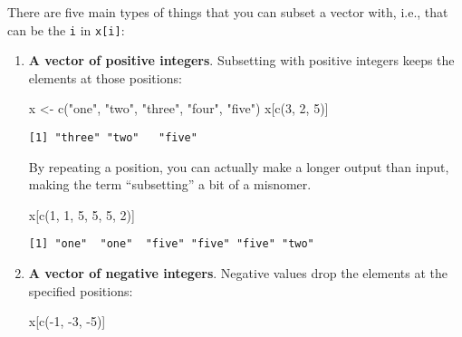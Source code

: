 \documentclass[
  letterpaper,
  DIV=11,
  numbers=noendperiod]{scrreprt}
\newenvironment{Shaded}{\begin{snugshade}}{\end{snugshade}}
\newcommand{\DecValTok}[1]{\textcolor[rgb]{0.68,0.00,0.00}{#1}}
\newcommand{\FunctionTok}[1]{\textcolor[rgb]{0.28,0.35,0.67}{#1}}
\newcommand{\NormalTok}[1]{\textcolor[rgb]{0.00,0.23,0.31}{#1}}
\newcommand{\OtherTok}[1]{\textcolor[rgb]{0.00,0.23,0.31}{#1}}
\newcommand{\SpecialCharTok}[1]{\textcolor[rgb]{0.37,0.37,0.37}{#1}}
\newcommand{\StringTok}[1]{\textcolor[rgb]{0.13,0.47,0.30}{#1}}
\begin{document}
There are five main types of things that you can subset a vector with,
i.e., that can be the \texttt{i} in \texttt{x{[}i{]}}:

\begin{enumerate}
\def\labelenumi{\arabic{enumi}.}
\item
  \textbf{A vector of positive integers}. Subsetting with positive
  integers keeps the elements at those positions:

\begin{Shaded}
\begin{Highlighting}[]
\NormalTok{x }\OtherTok{\textless{}{-}} \FunctionTok{c}\NormalTok{(}\StringTok{"one"}\NormalTok{, }\StringTok{"two"}\NormalTok{, }\StringTok{"three"}\NormalTok{, }\StringTok{"four"}\NormalTok{, }\StringTok{"five"}\NormalTok{)}
\NormalTok{x[}\FunctionTok{c}\NormalTok{(}\DecValTok{3}\NormalTok{, }\DecValTok{2}\NormalTok{, }\DecValTok{5}\NormalTok{)]}
\end{Highlighting}
\end{Shaded}

\begin{verbatim}
[1] "three" "two"   "five" 
\end{verbatim}

  By repeating a position, you can actually make a longer output than
  input, making the term ``subsetting'' a bit of a misnomer.

\begin{Shaded}
\begin{Highlighting}[]
\NormalTok{x[}\FunctionTok{c}\NormalTok{(}\DecValTok{1}\NormalTok{, }\DecValTok{1}\NormalTok{, }\DecValTok{5}\NormalTok{, }\DecValTok{5}\NormalTok{, }\DecValTok{5}\NormalTok{, }\DecValTok{2}\NormalTok{)]}
\end{Highlighting}
\end{Shaded}

\begin{verbatim}
[1] "one"  "one"  "five" "five" "five" "two" 
\end{verbatim}
\item
  \textbf{A vector of negative integers}. Negative values drop the
  elements at the specified positions:

\begin{Shaded}
\begin{Highlighting}[]
\NormalTok{x[}\FunctionTok{c}\NormalTok{(}\SpecialCharTok{{-}}\DecValTok{1}\NormalTok{, }\SpecialCharTok{{-}}\DecValTok{3}\NormalTok{, }\SpecialCharTok{{-}}\DecValTok{5}\NormalTok{)]}
\end{Highlighting}
\end{Shaded}


\end{enumerate}
\end{document}

